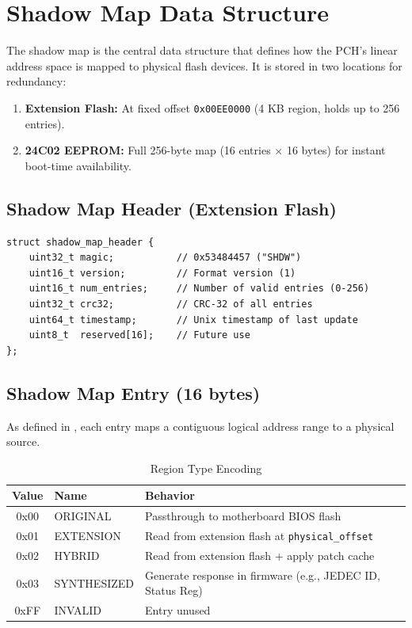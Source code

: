 \section{Shadow Map Data Structure}
\label{app:shadow_map}

The shadow map is the central data structure that defines how the \ac{PCH}'s linear address space is mapped to physical flash devices. It is stored in two locations for redundancy:
\begin{enumerate}
    \item \textbf{Extension Flash:} At fixed offset \texttt{0x00EE0000} (4 KB region, holds up to 256 entries).
    \item \textbf{24C02 EEPROM:} Full 256-byte map (16 entries $\times$ 16 bytes) for instant boot-time availability.
\end{enumerate}

\subsection{Shadow Map Header (Extension Flash)}
\begin{lstlisting}[style=vbfcStyle, caption={Shadow Map Header in Extension Flash}, label={lst:shadow_header}]
struct shadow_map_header {
    uint32_t magic;           // 0x53484457 ("SHDW")
    uint16_t version;         // Format version (1)
    uint16_t num_entries;     // Number of valid entries (0-256)
    uint32_t crc32;           // CRC-32 of all entries
    uint64_t timestamp;       // Unix timestamp of last update
    uint8_t  reserved[16];    // Future use
};
\end{lstlisting}

\subsection{Shadow Map Entry (16 bytes)}
As defined in , each entry maps a contiguous logical address range to a physical source.

\begin{table}[h]
\centering
\caption{Region Type Encoding}
\label{tab:region_type}
\begin{tabular}{@{}cll@{}}
\toprule
\textbf{Value} & \textbf{Name} & \textbf{Behavior} \\
\midrule
0x00 & ORIGINAL & Passthrough to motherboard BIOS flash \\
0x01 & EXTENSION & Read from extension flash at \texttt{physical\_offset} \\
0x02 & HYBRID   & Read from extension flash + apply patch cache \\
0x03 & SYNTHESIZED & Generate response in firmware (e.g., JEDEC ID, Status Reg) \\
0xFF & INVALID  & Entry unused \\
\bottomrule
\end{tabular}
\end{table}

